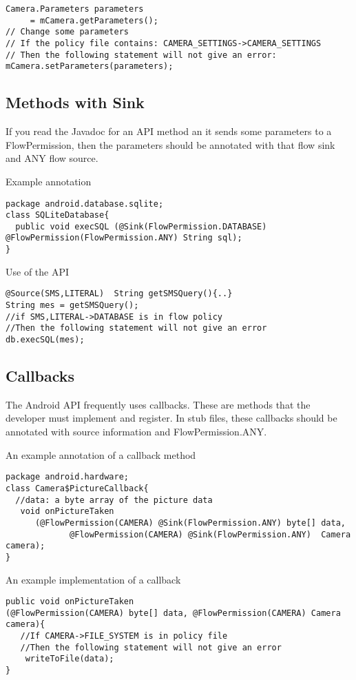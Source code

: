 \begin{Verbatim}
Camera.Parameters parameters
     = mCamera.getParameters();
// Change some parameters
// If the policy file contains: CAMERA_SETTINGS->CAMERA_SETTINGS
// Then the following statement will not give an error:
mCamera.setParameters(parameters);
\end{Verbatim}



\subsection{Methods with Sink}
If you read the Javadoc for an API method an it sends some parameters to a FlowPermission, then the parameters
should be annotated with that flow sink and ANY flow source.  

Example annotation
\begin{Verbatim}
package android.database.sqlite;
class SQLiteDatabase{
  public void execSQL (@Sink(FlowPermission.DATABASE) @FlowPermission(FlowPermission.ANY) String sql);
}
\end{Verbatim}
Use of the API
\begin{Verbatim}
@Source(SMS,LITERAL)  String getSMSQuery(){..}
String mes = getSMSQuery();
//if SMS,LITERAL->DATABASE is in flow policy
//Then the following statement will not give an error
db.execSQL(mes);
\end{Verbatim}

\subsection{Callbacks}
The Android API frequently uses callbacks.  These are methods that the developer must 
implement and register.  In stub files, these callbacks should be annotated
with source information and FlowPermission.ANY.  

An example annotation of a callback method
\begin{Verbatim}
package android.hardware;
class Camera$PictureCallback{
  //data: a byte array of the picture data
   void onPictureTaken 
      (@FlowPermission(CAMERA) @Sink(FlowPermission.ANY) byte[] data, 
             @FlowPermission(CAMERA) @Sink(FlowPermission.ANY)  Camera camera);
}
\end{Verbatim}

An example implementation of a callback
\begin{Verbatim}
public void onPictureTaken
(@FlowPermission(CAMERA) byte[] data, @FlowPermission(CAMERA) Camera camera){
   //If CAMERA->FILE_SYSTEM is in policy file
   //Then the following statement will not give an error
    writeToFile(data);
}
\end{Verbatim}


